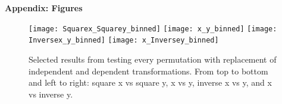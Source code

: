 \documentclass[12pt, letterpaper]{article}
\begin{document}
\newpage
\noindent\textbf{Appendix: Figures}
\begin{figure}[H]
    \texttt{[image: Squarex\_Squarey\_binned]}
    \texttt{[image: x\_y\_binned]}
    \texttt{[image: Inversex\_y\_binned]}
    \texttt{[image: x\_Inversey\_binned]}
    \caption{Selected results from testing every permutation with replacement of independent and dependent transformations. From top to bottom and left to right: square x vs square y, x vs y, inverse x vs y, and x vs inverse y.}
    \label{fig:perm}
\end{figure}
\end{document}
